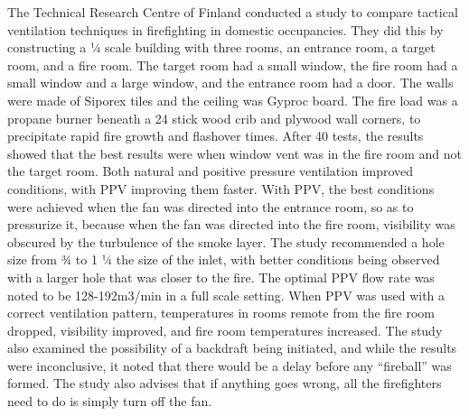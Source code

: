 \documentclass{article}
\begin{document}
\begin{appendices}
The Technical Research Centre of Finland conducted a study to compare tactical ventilation techniques in firefighting in domestic occupancies. They did this by constructing a ¼ scale building with three rooms, an entrance room, a target room, and a fire room. The target room had a small window, the fire room had a small window and a large window, and the entrance room had a door. The walls were made of Siporex tiles and the ceiling was Gyproc board. The fire load was a propane burner beneath a 24 stick wood crib and plywood wall corners, to precipitate rapid fire growth and flashover times. After 40 tests, the results showed that the best results were when window vent was in the fire room and not the target room. Both natural and positive pressure ventilation improved conditions, with PPV improving them faster. With PPV, the best conditions were achieved when the fan was directed into the entrance room, so as to pressurize it, because when the fan was directed into the fire room, visibility was obscured by the turbulence of the smoke layer. The study recommended a hole size from ¾ to 1 ¼ the size of the inlet, with better conditions being observed with a larger hole that was closer to the fire. The optimal PPV flow rate was noted to be 128-192m3/min in a full scale setting. When PPV was used with a correct ventilation pattern, temperatures in rooms remote from the fire room dropped, visibility improved, and fire room temperatures increased. The study also examined the possibility of a backdraft being initiated, and while the results were inconclusive, it noted that there would be a delay before any “fireball” was formed. The study also advises that if anything goes wrong, all the firefighters need to do is simply turn off the fan.\cite{TuomisaariPPV}
	

\end{appendices}
\end{document}
